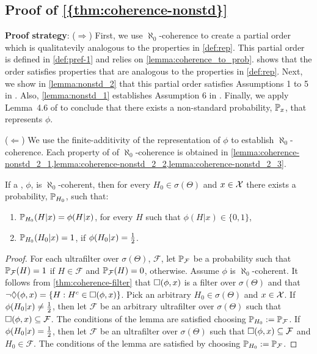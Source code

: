 \subsection{Proof of \cref{{thm:coherence-nonstd}}}

\textbf{Proof strategy}: ($\Rightarrow$) First, we use $\aleph_0$-coherence to create a partial order which is qualitatevily analogous to the properties in \cref{def:rep}. This partial order is defined in \cref{def:pref-1} and relies on \cref{lemma:coherence_to_prob}.  shows that the order satisfies properties that are analogous to the properties in \cref{def:rep}. Next, we show in \cref{lemma:nonstd_2} that this partial order satisfies Assumptions 1 to 5 in \citet{Schervish2025}. Also, \cref{lemma:nonstd_1} establishes Assumption 6 in \citet{Schervish2025}. Finally, we apply Lemma~4.6 of \citet{Schervish2025} to conclude that there exists a non-standard probability, $\P_x$, that represents $\phi$.

($\Leftarrow$) We use the finite-additivity of the representation of $\phi$ to establish $\aleph_0$-coherence. Each property of of $\aleph_0$-coherence is obtained in \cref{lemma:coherence-nonstd_2_1,lemma:coherence-nonstd_2_2,lemma:coherence-nonstd_2_3}.

\begin{lemma}
 \label{lemma:coherence_to_prob}
 If a \summ, $\phi$, is $\aleph_0$-coherent, then for every $H_0 \in \sigma(\Theta)$ and $x \in \sX$ there exists a probability, $\P_{H_{0}}$, such that:
 \begin{enumerate}
  \item $\P_{H_{0}}(H|x) = \phi(H|x)$, for every $H$ such that $\phi(H|x) \in \{0,1\}$,
  \item $\P_{H_{0}}(H_0|x) = 1$, if $\phi(H_0|x) = \half$.
 \end{enumerate}
\end{lemma}

\begin{proof}  
 For each ultrafilter over $\sigma(\Theta)$, $\mathcal{F}$,
 let $\P_{\mathcal{F}}$ be a probability such that
 $\P_{\mathcal{F}}(H) = 1$ if 
 $H \in \mathcal{F}$ and
 $\P_{\mathcal{F}}(H) = 0$, otherwise.
 Assume $\phi$ is $\aleph_0$-coherent.
 It follows from \cref{thm:coherence-filter} that
 $\AA(\phix)$ is a filter over $\sigma(\Theta)$
 and that $\RR(\phix) = \{H: H^c \in \AA(\phix)\}$.
 Pick an arbitrary $H_0 \in \sigma(\Theta)$ and $x \in \sX$.
 If $\phi(H_0|x) \neq \half$, then let
 $\mathcal{F}$ be an arbitrary ultrafilter over $\sigma(\Theta)$
 such that $\AA(\phix) \subseteq \mathcal{F}$.
 The conditions of the lemma are satisfied choosing
 $\P_{H_0} := \P_{\mathcal{F}}$.
 If $\phi(H_0|x) = \half$, then let
 $\mathcal{F}$ be an
 ultrafilter over $\sigma(\Theta)$ such that
 $\AA(\phix) \subseteq \mathcal{F}$ and
 $H_0 \in \mathcal{F}$.
 The conditions of the lemma are satisfied by
 choosing $\P_{H_0} := \P_{\mathcal{F}}$.
\end{proof}

